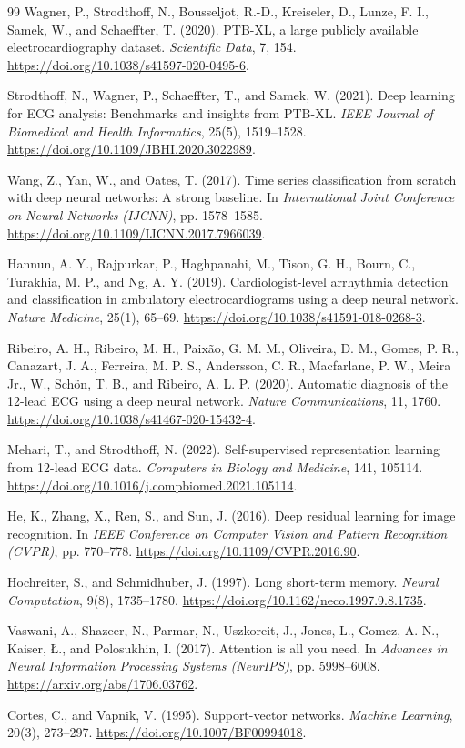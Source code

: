 \documentclass{article}
\begin{document}
\clearpage
\begin{thebibliography}{99}
\small
{}
Wagner, P., Strodthoff, N., Bousseljot, R.-D., Kreiseler, D., Lunze, F. I., Samek, W., and Schaeffter, T. (2020). PTB-XL, a large publicly available electrocardiography dataset. \emph{Scientific Data}, 7, 154. \url{https://doi.org/10.1038/s41597-020-0495-6}.

Strodthoff, N., Wagner, P., Schaeffter, T., and Samek, W. (2021). Deep learning for ECG analysis: Benchmarks and insights from PTB-XL. \emph{IEEE Journal of Biomedical and Health Informatics}, 25(5), 1519--1528. \url{https://doi.org/10.1109/JBHI.2020.3022989}.

Wang, Z., Yan, W., and Oates, T. (2017). Time series classification from scratch with deep neural networks: A strong baseline. In \emph{International Joint Conference on Neural Networks (IJCNN)}, pp. 1578--1585. \url{https://doi.org/10.1109/IJCNN.2017.7966039}.

Hannun, A. Y., Rajpurkar, P., Haghpanahi, M., Tison, G. H., Bourn, C., Turakhia, M. P., and Ng, A. Y. (2019). Cardiologist-level arrhythmia detection and classification in ambulatory electrocardiograms using a deep neural network. \emph{Nature Medicine}, 25(1), 65--69. \url{https://doi.org/10.1038/s41591-018-0268-3}.

Ribeiro, A. H., Ribeiro, M. H., Paix\~ao, G. M. M., Oliveira, D. M., Gomes, P. R., Canazart, J. A., Ferreira, M. P. S., Andersson, C. R., Macfarlane, P. W., Meira Jr., W., Sch\"on, T. B., and Ribeiro, A. L. P. (2020). Automatic diagnosis of the 12-lead ECG using a deep neural network. \emph{Nature Communications}, 11, 1760. \url{https://doi.org/10.1038/s41467-020-15432-4}.

Mehari, T., and Strodthoff, N. (2022). Self-supervised representation learning from 12-lead ECG data. \emph{Computers in Biology and Medicine}, 141, 105114. \url{https://doi.org/10.1016/j.compbiomed.2021.105114}.

He, K., Zhang, X., Ren, S., and Sun, J. (2016). Deep residual learning for image recognition. In \emph{IEEE Conference on Computer Vision and Pattern Recognition (CVPR)}, pp. 770--778. \url{https://doi.org/10.1109/CVPR.2016.90}.

Hochreiter, S., and Schmidhuber, J. (1997). Long short-term memory. \emph{Neural Computation}, 9(8), 1735--1780. \url{https://doi.org/10.1162/neco.1997.9.8.1735}.

Vaswani, A., Shazeer, N., Parmar, N., Uszkoreit, J., Jones, L., Gomez, A. N., Kaiser, \L., and Polosukhin, I. (2017). Attention is all you need. In \emph{Advances in Neural Information Processing Systems (NeurIPS)}, pp. 5998--6008. \url{https://arxiv.org/abs/1706.03762}.

Cortes, C., and Vapnik, V. (1995). Support-vector networks. \emph{Machine Learning}, 20(3), 273--297. \url{https://doi.org/10.1007/BF00994018}.
\end{thebibliography}
\end{document}
